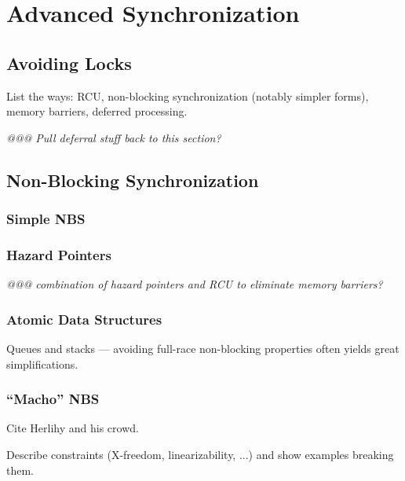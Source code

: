 
\chapter{Advanced Synchronization}
\label{sec:advsync:Advanced Synchronization}


\section{Avoiding Locks}
\label{sec:advsync:Avoiding Locks}

List the ways: RCU, non-blocking synchronization (notably simpler forms),
memory barriers, deferred processing.

\emph{@@@ Pull deferral stuff back to this section?}



\section{Non-Blocking Synchronization}
\label{sec:advsync:Non-Blocking Synchronization}

\subsection{Simple NBS}
\label{sec:advsync:Simple NBS}

\subsection{Hazard Pointers}
\label{sec:advsync:Hazard Pointers}

\emph{@@@ combination of hazard pointers and RCU to eliminate memory barriers?}

\subsection{Atomic Data Structures}
\label{sec:advsync:Atomic Data Structures}

Queues and stacks --- avoiding full-race non-blocking properties
often yields great simplifications.

\subsection{``Macho'' NBS}
\label{sec:advsync:``Macho'' NBS}

Cite Herlihy and his crowd.

Describe constraints (X-freedom, linearizability, ...) and show examples
breaking them.
